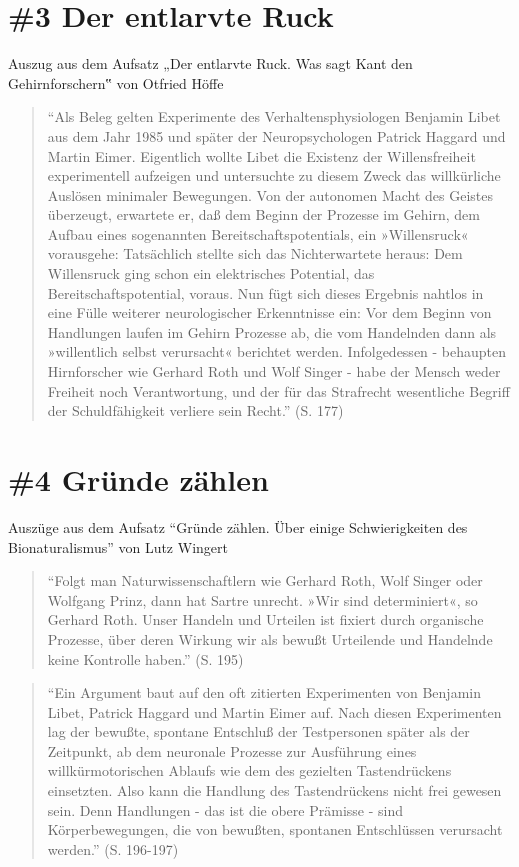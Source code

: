 \documentclass[
  a4paper,
]{report}
\begin{document}
\hypertarget{def-ev3}{%
\section{\#3 Der entlarvte Ruck}\label{def-ev3}}

Auszug aus dem Aufsatz „Der entlarvte Ruck. Was sagt Kant den Gehirnforschern‟ von Otfried Höffe \citeyearpar{Höffe2004}

\begin{quote}
``Als Beleg gelten Experimente des Verhaltensphysiologen Benjamin Libet aus dem Jahr 1985 und später der Neuropsychologen Patrick Haggard und Martin Eimer. Eigentlich wollte Libet die Existenz der Willensfreiheit experimentell aufzeigen und untersuchte zu diesem Zweck das willkürliche Auslösen minimaler Bewegungen. Von der autonomen Macht des Geistes überzeugt, erwartete er, daß dem Beginn der Prozesse im Gehirn, dem Aufbau eines sogenannten Bereitschaftspotentials, ein »Willensruck« vorausgehe: Tatsächlich stellte sich das Nichterwartete heraus: Dem Willensruck ging schon ein elektrisches Potential, das Bereitschaftspotential, voraus. Nun fügt sich dieses Ergebnis nahtlos in eine Fülle weiterer neurologischer Erkenntnisse ein: Vor dem Beginn von Handlungen laufen im Gehirn Prozesse ab, die vom Handelnden dann als »willentlich selbst verursacht« berichtet werden. Infolgedessen - behaupten Hirnforscher wie Gerhard Roth und Wolf Singer - habe der Mensch weder Freiheit noch Verantwortung, und der für das Strafrecht wesentliche Begriff der Schuldfähigkeit verliere sein Recht.'' (S. 177)
\end{quote}

\hypertarget{def-ev4}{%
\section{\#4 Gründe zählen}\label{def-ev4}}

Auszüge aus dem Aufsatz ``Gründe zählen. Über einige Schwierigkeiten des Bionaturalismus'' von Lutz Wingert \citeyearpar{Lutz2004}

\begin{quote}
``Folgt man Naturwissenschaftlern wie Gerhard Roth, Wolf Singer oder Wolfgang Prinz, dann hat Sartre unrecht. »Wir sind determiniert«, so Gerhard Roth. Unser Handeln und Urteilen ist fixiert durch organische Prozesse, über deren Wirkung wir als bewußt Urteilende und Handelnde keine Kontrolle haben.'' (S. 195)
\end{quote}

\begin{quote}
``Ein Argument baut auf den oft zitierten Experimenten von Benjamin Libet, Patrick Haggard und Martin Eimer auf. Nach diesen Experimenten lag der bewußte, spontane Entschluß der Testpersonen später als der Zeitpunkt, ab dem neuronale Prozesse zur Ausführung eines willkürmotorischen Ablaufs wie dem des gezielten Tastendrückens einsetzten. Also kann die Handlung des Tastendrückens nicht frei gewesen sein. Denn Handlungen - das ist die obere Prämisse - sind Körperbewegungen, die von bewußten, spontanen Entschlüssen verursacht werden.'' (S. 196-197)
\end{quote}
\end{document}
